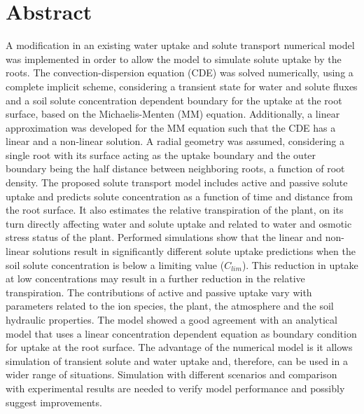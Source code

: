 \section*{Abstract}

A modification in an existing water uptake and solute transport numerical model was implemented in order to allow the model to simulate solute uptake by the roots.
The convection-dispersion equation (CDE) was solved numerically, using a complete implicit scheme, considering a transient state for water and solute fluxes and a soil solute concentration dependent boundary for the uptake at the root surface, based on the Michaelis-Menten (MM) equation.
Additionally, a linear approximation was developed for the MM equation such that the CDE has a linear and a non-linear solution.
A radial geometry was assumed, considering a single root with its surface acting as the uptake boundary and the outer boundary being the half distance between neighboring roots, a function of root density.
The proposed solute transport model includes active and passive solute uptake and predicts solute concentration as a function of time and distance from the root surface.
It also estimates the relative transpiration of the plant, on its turn directly affecting water and solute uptake and related to water and osmotic stress status of the plant.
Performed simulations show that the linear and non-linear solutions result in significantly different solute uptake predictions when the soil solute concentration is below a limiting value ($C_{lim}$).
This reduction in uptake at low concentrations may result in a further reduction in the relative transpiration.
The contributions of active and passive uptake vary with parameters related to the ion species, the plant, the atmosphere and the soil hydraulic properties. 
The model showed a good agreement with an analytical model that uses a linear concentration dependent equation as boundary condition for uptake at the root surface.
The advantage of the numerical model is it allows simulation of transient solute and water uptake and, therefore, can be used in a wider range of situations.
Simulation with different scenarios and comparison with experimental results are needed to verify model performance and possibly suggest improvements.

